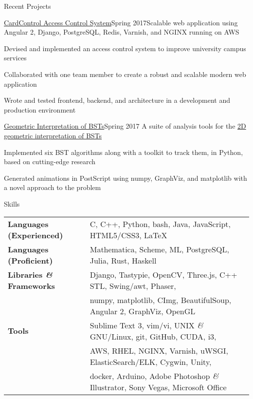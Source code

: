 \documentclass{resume}
\begin{document}
  \begin{rSection}{Recent Projects}
    \begin{rSubsection}{\href{https://github.com/CaerusKaru/cardcontrol}{CardControl Access Control System}}{Spring 2017}{Scalable web application using Angular 2, Django, PostgreSQL, Redis, Varnish, and NGINX running on AWS}{}
    \item Devised and implemented an access control system to improve university campus services
    \item Collaborated with one team member to create a robust and scalable modern web application
    \item Wrote and tested frontend, backend, and architecture in a development and production environment
    \end{rSubsection}
    
    \begin{rSubsection}{\href{https://github.com/forsooth/BST-analysis}{Geometric Interpretation of BSTs}}{Spring 2017}
    {A suite of analysis tools for the \href{https://en.wikipedia.org/wiki/Geometry_of_binary_search_trees}{2D geometric interpretation of BSTs}} {}
    \item Implemented six BST algorithms along with a toolkit to track them, in Python, based on cutting-edge research
    \item Generated animations in PostScript using numpy, GraphViz, and matplotlib with a novel approach to the problem
    \end{rSubsection}
  
  \end{rSection}
  
  \begin{rSection}{Skills}
    \begin{tabular}{ @{} >{\bfseries}l @{\hspace{6ex}} l }
      Languages (Experienced)& C, C++, Python, bash, Java, JavaScript, HTML5/CSS3, \LaTeX\\
      Languages (Proficient)& Mathematica, Scheme, ML, PostgreSQL, Julia, Rust, Haskell\\
      Libraries \textit{\&} Frameworks & Django, Tastypie, OpenCV, Three.js, C++ STL, Swing/awt, Phaser,\\
      & numpy, matplotlib, CImg, BeautifulSoup, Angular 2, GraphViz, OpenGL\\
      Tools & Sublime Text 3, vim/vi, UNIX \textit{\&} GNU/Linux, git, GitHub, CUDA, i3,\\
      & AWS, RHEL, NGINX, Varnish, uWSGI, ElasticSearch/ELK, Cygwin, Unity,\\
      & docker, Arduino, Adobe Photoshop \textit{\&} Illustrator, Sony Vegas, Microsoft Office
    \end{tabular}
  \end{rSection}
\end{document}
